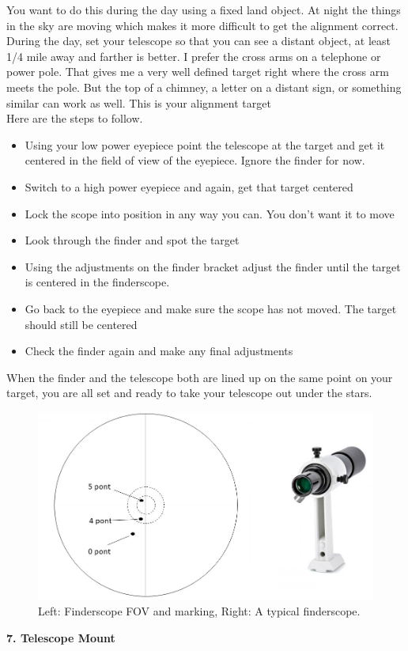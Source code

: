 \documentclass[a4paper,12pt]{extarticle}
\begin{document}
You want to do this during the day using a fixed land object. At night the things in the sky are moving which makes it more difficult to get the alignment correct.\\

During the day, set your telescope so that you can see a distant object, at least 1/4 mile away and farther is better. I prefer the cross arms on a telephone or power pole. That gives me a very well defined target right where the cross arm meets the pole. But the top of a chimney, a letter on a distant sign, or something similar can work as well. This is your alignment target\\

Here are the steps to follow.

\begin{itemize}
	\itemsep0em 
	\item Using your low power eyepiece point the telescope at the target and get it centered in the field of view of the eyepiece. Ignore the finder for now.
	\item Switch to a high power eyepiece and again, get that target centered
	\item Lock the scope into position in any way you can. You don’t want it to move
	\item Look through the finder and spot the target
	\item Using the adjustments on the finder bracket adjust the finder until the target is centered in the finderscope.
	\item Go back to the eyepiece and make sure the scope has not moved. The target should still be centered
	\item Check the finder again and make any final adjustments
\end{itemize}

When the finder and the telescope both are lined up on the same point on your target, you are all set and ready to take your telescope out under the stars.

\begin{figure}[H]
	\centering
	\includegraphics[width=0.8\linewidth]{finderscope.png}
	\caption{Left: Finderscope FOV and marking, Right: A typical finderscope.}
\end{figure}
\textbf{7. Telescope Mount}\\
\end{document}
